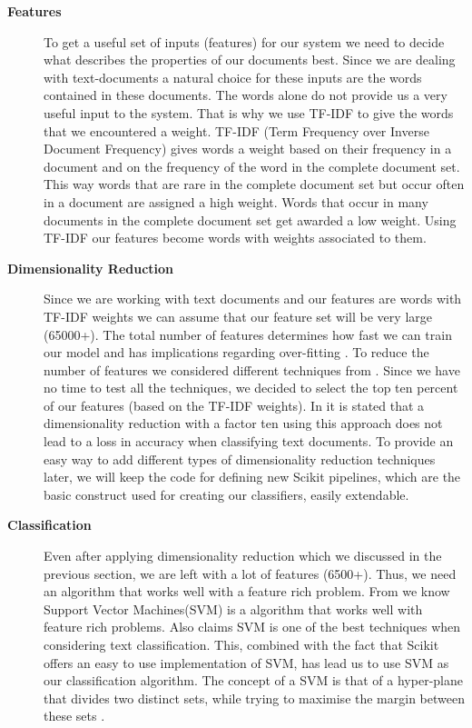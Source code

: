 \begin{description}
\item[\textbf{Features}] 
To get a useful set of inputs (features) for our system we need to decide what describes the properties of our documents best. Since we are dealing with text-documents a natural choice for these inputs are the words contained in these documents. 
The words alone do not provide us a very useful input to the system. That is why we use TF-IDF to give the words that we encountered a weight. TF-IDF (Term Frequency over Inverse Document Frequency) gives words a weight based on their frequency in a document and on the frequency of the word in the complete document set. This way words that are rare in the complete document set but occur often in a document are assigned a high weight. Words that occur in many documents in the complete document set get awarded a low weight\cite{ramos_tfidf}.
Using TF-IDF our features become words with weights associated to them.

\item[\textbf{Dimensionality Reduction}]
Since we are working with text documents and our features are words with TF-IDF weights we can assume that our feature set will be very large (65000+). The total number of features determines how fast we can train our model and has implications regarding over-fitting \cite{ml_text}. To reduce the number of features we considered different techniques from \cite{ml_text}. Since we have no time to test all the techniques, we decided to select the top ten percent of our features (based on the TF-IDF weights). In \cite{yang1997} it is stated that a dimensionality reduction with a factor ten using this approach does not lead to a loss in accuracy when classifying text documents. To provide an easy way to add different types of dimensionality reduction techniques later, we will keep the code for defining new Scikit pipelines, which are the basic construct used for creating our classifiers, easily extendable.

\item[\textbf{Classification}]
Even after applying dimensionality reduction which we discussed in the previous section, we are left with a lot of features (6500+). Thus, we need an algorithm that works well with a feature rich problem. From \cite{MLCheatSheet} we know Support Vector Machines(SVM) is a algorithm that works well with feature rich problems. Also \cite{ml_text} claims SVM is one of the best techniques when considering text classification. This, combined with the fact that Scikit offers an easy to use implementation of SVM, has lead us to use SVM as our classification algorithm. The concept of a SVM is that of a hyper-plane that divides two distinct sets, while trying to maximise the margin between these sets \cite{tong2001support}.
\end{description}

